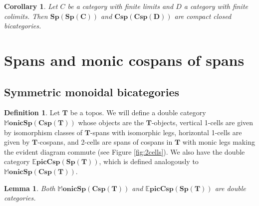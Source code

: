 \documentclass[11pt]{amsart}
\newcommand{\cat}[1]{\mathbf{#1}}
\newcommand{\bispsp}[1]{\mathbf{Sp(Sp(#1))}}
\newcommand{\bicspcsp}[1]{\mathbf{Csp(Csp(#1))}}
\newcommand{\dblmonspcsp}[1]{\mathbb{M}\mathbf{onicSp(Csp(#1))}}
\newcommand{\dblepiccspsp}[1]{\mathbb{E}\mathbf{picCsp(Sp(#1))}}
\newtheorem{lem}[thm]{Lemma}
\newtheorem{cor}[thm]{Corollary}
\theoremstyle{remark}
\theoremstyle{definition}
\newtheorem{defn}[thm]{Definition}
\begin{document}
\begin{cor}
	\label{cor:SpansSpansAreCCBicat}
	Let $C$ be a category with finite limits and $D$ a category with finite colimits. Then $\bispsp{C}$ and $\bicspcsp{D}$ are compact closed bicategories.
\end{cor}

\section{Spans and monic cospans of spans} %
\label{sec:SpansCospans}

\subsection{Symmetric monoidal bicategories} %
\label{subsec.SpansCospansAreSMBicat}


\begin{defn}
\label{def:DblCatMonSpanCsp}
	Let $\cat{T}$ be a topos. We will define a double category $\dblmonspcsp{T}$ whose objects are the $\cat{T}$-objects, vertical 1-cells are given by isomorphism classes of $\cat{T}$-spans with isomorphic legs, horizontal 1-cells are given by $\cat{T}$-cospans, and 2-cells are spans of cospans in $\cat{T}$ with monic legs making the evident diagram commute (see Figure \ref{fig:2cells}). We also have the double category $\dblepiccspsp{T}$, which is defined analogously to $\dblmonspcsp{T}$. 
\end{defn}

\begin{lem}
\label{lem:SpanCospanDoubleCat}
	Both $\dblmonspcsp{T}$ and $\dblepiccspsp{T}$ are double categories.  
\end{lem}
\end{document}
